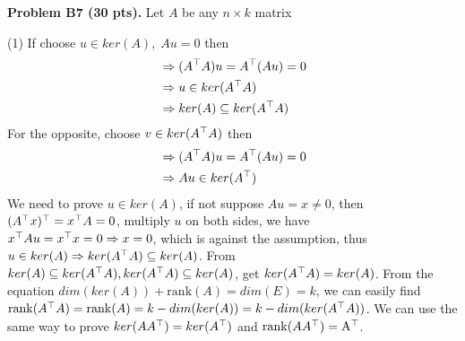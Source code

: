 \documentclass[12pt]{article}
\begin{document}
\vspace {0.25cm}\noindent
{\bf Problem B7 (30 pts).} 
Let $A$ be any $n\times k$ matrix

\medskip
(1) If choose $u \in ker(A), \;  Au = 0$ then
\begin{align*}
&\Rightarrow (A^{\top} A) u =  A^{\top} (A u) = 0 \\
&\Rightarrow u  \in ker(A^{\top} A) \\
&\Rightarrow ker(A) \subseteq ker(A^{\top} A)
\end{align*}
For the opposite, choose $v \in ker(A^{\top} A)$ then 
\begin{align*}
&\Rightarrow (A^{\top} A) u = A^{\top} (A u) = 0 \\
&\Rightarrow A u \in ker(A^{\top}) 
\end{align*}
We need to prove $u \in ker(A)$, if not suppose $A u = x \neq 0$, then $( A^{\top} x) ^{\top} = x^{\top} A = 0$, multiply $u$ on both sides, we have $x^{\top} A u = x^{\top} x = 0 \Rightarrow x = 0$, which is against the assumption, thus $u \in ker(A) \Rightarrow ker(A^{\top} A) \subseteq ker(A)$. From $ker(A) \subseteq ker(A^{\top} A), ker(A^{\top} A) \subseteq ker(A)$, get $ker(A^{\top} A) = ker(A)$.
From the equation $ dim(ker(A)) + \mathrm{rank}(A) = dim(E) = k$, we can easily find $\mathrm{rank} (A^{\top} A) = \mathrm{rank}(A) = k - dim(ker(A)) = k - dim(ker(A^{\top}A))$. We can use the same way to prove $ker(AA^{\top}) = ker(A^{\top})$ and $\mathrm{rank}(AA^{\top}) = \mathrm{A^{\top}}$. 
\end{document}
